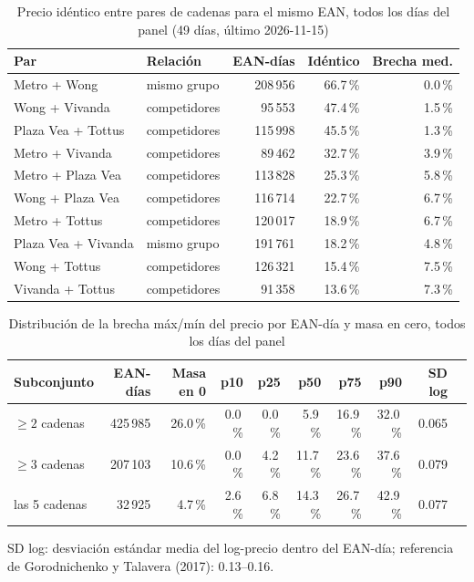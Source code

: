 
\begin{table}[htbp]
\caption{Precio id\'entico entre pares de cadenas para el mismo EAN, todos los d\'ias del panel (49 d\'ias, \'ultimo 2026-11-15)}
\label{tab:identidad}
\centering\scriptsize\setlength{\tabcolsep}{3pt}
\begin{tabular}{@{}llrrr@{}}
\toprule
Par & Relaci\'on & EAN-d\'ias & Id\'entico & Brecha med. \\
\midrule
Metro + Wong & mismo grupo & 208\,956 & 66.7\,\% & 0.0\,\% \\
Wong + Vivanda & competidores & 95\,553 & 47.4\,\% & 1.5\,\% \\
Plaza Vea + Tottus & competidores & 115\,998 & 45.5\,\% & 1.3\,\% \\
Metro + Vivanda & competidores & 89\,462 & 32.7\,\% & 3.9\,\% \\
Metro + Plaza Vea & competidores & 113\,828 & 25.3\,\% & 5.8\,\% \\
Wong + Plaza Vea & competidores & 116\,714 & 22.7\,\% & 6.7\,\% \\
Metro + Tottus & competidores & 120\,017 & 18.9\,\% & 6.7\,\% \\
Plaza Vea + Vivanda & mismo grupo & 191\,761 & 18.2\,\% & 4.8\,\% \\
Wong + Tottus & competidores & 126\,321 & 15.4\,\% & 7.5\,\% \\
Vivanda + Tottus & competidores & 91\,358 & 13.6\,\% & 7.3\,\% \\
\bottomrule\end{tabular}\end{table}

\begin{table}[t]
\caption{Distribuci\'on de la brecha m\'ax/m\'in del precio por EAN-d\'ia y masa en cero, todos los d\'ias del panel}
\label{tab:brecha}
\centering\scriptsize\setlength{\tabcolsep}{4pt}
\begin{tabular}{@{}lrrrrrrrrr@{}}
\toprule
Subconjunto & EAN-d\'ias & Masa en 0 & p10 & p25 & p50 & p75 & p90 & SD log \\
\midrule
$\geq 2$ cadenas & 425\,985 & 26.0\,\% & 0.0\,\% & 0.0\,\% & 5.9\,\% & 16.9\,\% & 32.0\,\% & 0.065 \\
$\geq 3$ cadenas & 207\,103 & 10.6\,\% & 0.0\,\% & 4.2\,\% & 11.7\,\% & 23.6\,\% & 37.6\,\% & 0.079 \\
las 5 cadenas & 32\,925 & 4.7\,\% & 2.6\,\% & 6.8\,\% & 14.3\,\% & 26.7\,\% & 42.9\,\% & 0.077 \\
\bottomrule\end{tabular}
\par\smallskip\raggedright\scriptsize SD log: desviaci\'on est\'andar media del log-precio dentro del EAN-d\'ia; referencia de Gorodnichenko y Talavera (2017): 0.13--0.16.
\end{table}

